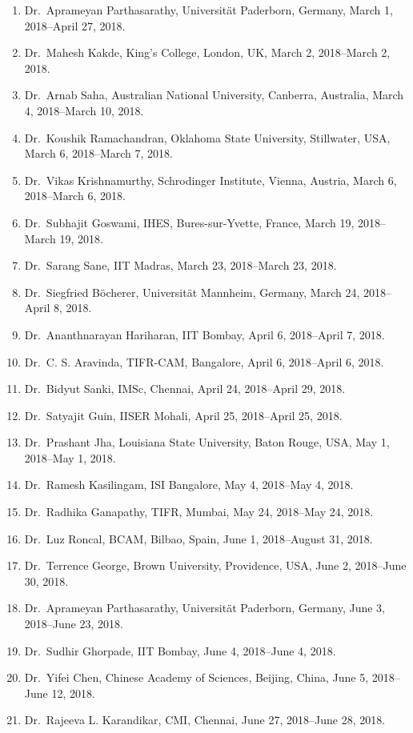 \begin{enumerate}
\item Dr.~Aprameyan Parthasarathy, Universität Paderborn, Germany, March 1, 2018--April 27, 2018.
\item Dr.~Mahesh Kakde, King's College, London, UK, March 2, 2018--March 2, 2018.
\item Dr.~Arnab Saha, Australian National University, Canberra, Australia, March 4, 2018--March 10, 2018.
\item Dr.~Koushik Ramachandran, Oklahoma State University, Stillwater, USA, March 6, 2018--March 7, 2018.
\item Dr.~Vikas Krishnamurthy, Schrodinger Institute, Vienna, Austria, March 6, 2018--March 6, 2018.
\item Dr.~Subhajit Goswami, IHES, Bures-sur-Yvette, France, March 19, 2018--March 19, 2018.
\item Dr.~Sarang Sane, IIT Madras, March 23, 2018--March 23, 2018.
\item Dr.~Siegfried Böcherer, Universität Mannheim, Germany, March 24, 2018--April 8, 2018.
\item Dr.~Ananthnarayan Hariharan, IIT Bombay, April 6, 2018--April 7, 2018.
\item Dr.~C. S. Aravinda, TIFR-CAM, Bangalore, April 6, 2018--April 6, 2018.
\item Dr.~Bidyut Sanki, IMSc, Chennai, April 24, 2018--April 29, 2018.
\item Dr.~Satyajit Guin, IISER Mohali, April 25, 2018--April 25, 2018.
\item Dr.~Prashant Jha, Louisiana State University, Baton Rouge, USA, May 1, 2018--May 1, 2018.
\item Dr.~Ramesh Kasilingam, ISI Bangalore, May 4, 2018--May 4, 2018.
\item Dr.~Radhika Ganapathy, TIFR, Mumbai, May 24, 2018--May 24, 2018.
\item Dr.~Luz Roncal, BCAM, Bilbao, Spain, June 1, 2018--August 31, 2018.
\item Dr.~Terrence George, Brown University, Providence, USA, June 2, 2018--June 30, 2018.
\item Dr.~Aprameyan Parthasarathy, Universität Paderborn, Germany, June 3, 2018--June 23, 2018.
\item Dr.~Sudhir Ghorpade, IIT Bombay, June 4, 2018--June 4, 2018.
\item Dr.~Yifei Chen, Chinese Academy of Sciences, Beijing, China, June 5, 2018--June 12, 2018.
\item Dr.~Rajeeva L. Karandikar, CMI, Chennai, June 27, 2018--June 28, 2018.

\end{enumerate}
